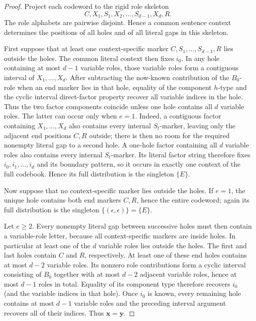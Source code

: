 \documentclass[11pt]{article}
\begin{document}
\begin{proof}
Project each codeword to the rigid role skeleton
\[
 C,X_1,S_1,X_2,\ldots,S_{d-1},X_d,R.
\]
The role alphabets are pairwise disjoint.  Hence a common sentence context
determines the positions of all holes and of all literal gaps in this
skeleton.

First suppose that at least one context-specific marker
\(C,S_1,\ldots,S_{d-1},R\) lies outside the holes.  The common literal
context then fixes \(i_0\).  In any hole containing at most
\(d-1\) variable roles, those variable roles form a contiguous interval
of \(X_1,\ldots,X_d\).  After subtracting the now-known contribution of
the \(B_0\)-role when an end marker lies in that hole, equality of the
component \(h\)-type and the cyclic interval direct-factor property recover
all variable indices in the hole.  Thus the two factor components coincide
unless one hole contains all \(d\) variable roles.  The latter can occur
only when \(e=1\).  Indeed, a contiguous factor containing
\(X_1,\ldots,X_d\) also contains every internal \(S_t\)-marker, leaving
only the adjacent end positions \(C,R\) outside; there is then no room for
the required nonempty literal gap to a second hole.  A one-hole factor
containing all \(d\) variable roles also contains every
internal \(S_t\)-marker.  Its literal factor string therefore fixes
\(i_0,i_1,\ldots,i_d\) and its boundary pattern, so it occurs in exactly
one context of the full codebook.  Hence its full distribution is the
singleton \(\{E\}\).

Now suppose that no context-specific marker lies outside the holes.  If
\(e=1\), the unique hole contains both end markers \(C,R\), hence the
entire codeword; again its full distribution is the singleton
\(\{(\epsilon,\epsilon)\}=\{E\}\).

Let \(e\ge2\).  Every nonempty literal gap between successive holes must
then contain a variable-role letter, because all context-specific markers
are inside holes.  In particular at least one of the \(d\) variable roles
lies outside the holes.  The first and last holes contain \(C\) and \(R\),
respectively.  At least one of these end holes contains at most \(d-2\)
variable roles.  Its nonzero role contributions form a cyclic interval
consisting of \(B_0\) together with at most \(d-2\) adjacent variable
roles, hence at most \(d-1\) roles in total.  Equality of its component type
therefore recovers \(i_0\) (and the variable indices in that hole).
Once \(i_0\) is known, every remaining hole contains at most \(d-1\)
variable roles and the preceding interval argument recovers all of their
indices.  Thus \(\mathbf x=\mathbf y\).
\end{proof}
\end{document}
